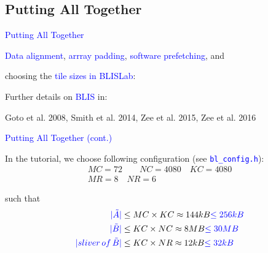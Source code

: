 \documentclass[11pt]{beamer}
\begin{document}
\subsection{Putting All Together}

\begin{frame}{\textcolor{blue}{Putting All Together}}

\textcolor{blue}{Data alignment}, \textcolor{blue}{arrray padding}, \textcolor{blue}{software prefetching}, and 

\qquad\qquad choosing the \textcolor{blue}{tile sizes in BLISLab}:

\vspace{-0.2cm}


\begin{small}
\begin{figure}
    \centering
    \def\svgwidth{0.9\columnwidth}
    
\end{figure}
\end{small}

\vspace{0.1cm}

Further details on \textcolor{blue}{BLIS} in:

\qquad Goto et al. 2008, Smith et al. 2014, Zee et al. 2015, Zee et al. 2016 

\end{frame}

\begin{frame}{\textcolor{blue}{Putting All Together (cont.)}}

In the tutorial, we choose following configuration (see \textcolor{blue}{\texttt{bl\_config.h}}):
\begin{align*}
MC = 72 \quad \quad NC = 4080 \quad KC = 4080\\
MR = 8 \quad NR = 6 \qquad\qquad
\end{align*}

such that
\begin{align*}
\textcolor{blue}{|\tilde{A}|} &\le MC \times KC \approx  144kB \textcolor{blue}{\le 256kB}\\
\textcolor{blue}{|\tilde{B}|} &\le KC \times NC \approx  8MB \textcolor{blue}{\le 30MB}\\
\textcolor{blue}{|sliver\,of\,\tilde{B}|} &\le KC \times NR \approx  12kB \textcolor{blue}{\le 32kB}\\
\end{align*}

\end{frame}
\end{document}
